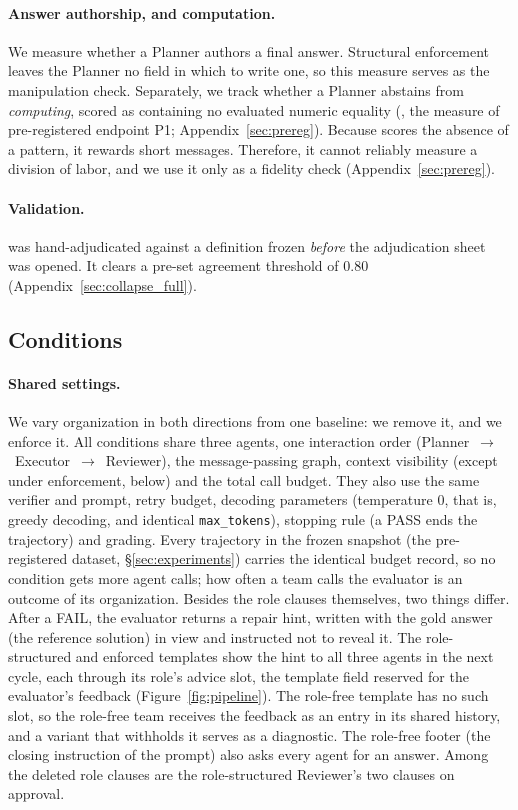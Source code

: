 \paragraph{Answer authorship, and computation.} We measure whether a Planner
authors a final answer. Structural enforcement leaves the Planner no field
in which to write one, so this measure serves as the manipulation check.
Separately, we track whether a Planner abstains from \emph{computing},
scored as containing no evaluated numeric equality (\textbf{\Pone{}}, the
measure of pre-registered endpoint P1; Appendix~\ref{sec:prereg}). Because \Pone{} scores the absence of a pattern, it rewards
short messages. Therefore, it cannot reliably measure a division of labor,
and we use it only as a fidelity check (Appendix~\ref{sec:prereg}).

\paragraph{Validation.} \Pone{} was hand-adjudicated against a definition
frozen \emph{before} the adjudication sheet was opened. It clears a pre-set
agreement threshold of $0.80$ (Appendix~\ref{sec:collapse_full}).

\subsection{Conditions}

\paragraph{Shared settings.} We vary organization in both directions from one baseline: we remove it, and
we enforce it. All conditions share three agents, one interaction order
(Planner~$\rightarrow$~Executor~$\rightarrow$~Reviewer), the message-passing
graph, context visibility (except under enforcement, below) and the total
call budget. They also use the same verifier and prompt, retry budget,
decoding parameters (temperature $0$, that is, greedy decoding, and
identical \texttt{max\_tokens}), stopping rule (a PASS ends the trajectory)
and grading. Every trajectory in the frozen snapshot (the pre-registered dataset,
\S\ref{sec:experiments}) carries the identical
budget record, so no condition gets more agent calls; how often a team
calls the evaluator is an outcome of its organization. Besides the role
clauses themselves, two things differ. After a FAIL, the evaluator returns a repair
hint, written with the gold answer (the reference solution) in view and
instructed not to reveal it. The role-structured and enforced templates show
the hint to all three agents in the next cycle, each through its role's
advice slot, the template field reserved for the evaluator's feedback
(Figure~\ref{fig:pipeline}). The role-free template has no such slot, so
the role-free team receives the feedback as an entry in its shared history,
and a variant that withholds it serves as a diagnostic. The
role-free footer (the closing instruction of the prompt) also asks every
agent for an answer. Among the deleted role clauses are the role-structured
Reviewer's two clauses on approval.

